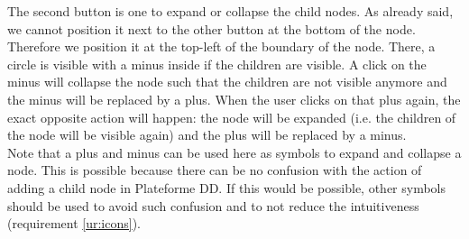 The second button is one to expand or collapse the child nodes. As already said, we cannot position it next to the other button at the bottom of the node. Therefore we position it at the top-left of the boundary of the node. There, a circle is visible with a minus inside if the children are visible. A click on the minus will collapse the node such that the children are not visible anymore and the minus will be replaced by a plus. When the user clicks on that plus again, the exact opposite action will happen: the node will be expanded (i.e. the children of the node will be visible again) and the plus will be replaced by a minus.\\

Note that a plus and minus can be used here as symbols to expand and collapse a node. This is possible because there can be no confusion with the action of adding a child node in Plateforme DD. If this would be possible, other symbols should be used to avoid such confusion and to not reduce the intuitiveness (requirement \ref{ur:icons}).


